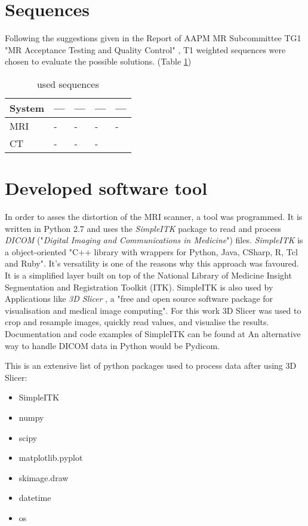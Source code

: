 \section{Sequences}
Following the suggestions given in the Report of AAPM MR Subcommittee TG1 "MR Acceptance Testing and
Quality Control" \cite{Jackson2009}, T1 weighted sequences were chosen to evaluate the possible solutions. (Table \ref{tab:settings})

\begin{table}[h]
\centering
\begin{tabular}{@{}lllll@{}}
System & ---  & --- &  --- & --- \\
\toprule
MRI    & -   & -   & -   & -    \\
CT     & -   & -   & -   &
\end{tabular}
\caption{used sequences}
\label{tab:settings}
\end{table}

\section{Developed software tool}

In order to asses the distortion of the MRI scanner, a tool was programmed.
It is written in Python 2.7 and uses the \textit{SimpleITK} package to read and process \textit{DICOM} ("\textit{Digital Imaging and Communications in Medicine}") files. \cite{Python, DICOM}
\textit{SimpleITK} is a object-oriented "C++ library with wrappers for Python, Java, CSharp, R, Tcl and Ruby". \cite{SimpleITK, SimpleITK_started} It's versatility is one of the reasons why this approach was favoured.
It is a simplified layer built on top of the National Library of Medicine Insight Segmentation and Registration Toolkit (ITK). SimpleITK is also used by Applications like \textit{3D Slicer} , a "free and open source software package for
visualisation and medical image computing". \cite{3DSlicer, Kikinis2012} For this work 3D Slicer was used to crop and resample images, quickly read values, and visualise the results.
Documentation and code examples of SimpleITK can be found at \cite{InsightSoftwareConsortium, Kyriakou-SimpleITK}
An alternative way to handle DICOM data in Python would be Pydicom. \cite{Pydicom, Kyriakou-Pydicom-VTK} 

This is an extensive list of python packages used to process data after using 3D Slicer:
\begin{itemize}
 \item SimpleITK
 \item numpy
 \item scipy
 \item matplotlib.pyplot \cite{Hunter2007}
 \item skimage.draw
 \item datetime
 \item os
\end{itemize}

